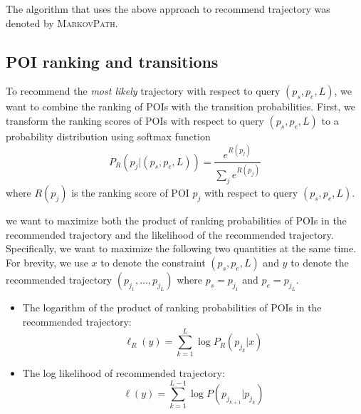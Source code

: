 The algorithm that uses the above approach to recommend trajectory was denoted by \textsc{MarkovPath}.


\subsection{POI ranking and transitions}
To recommend the \textit{most likely} trajectory with respect to query $(p_s, p_e, L)$,
we want to combine the ranking of POIs with the transition probabilities.
First, we transform the ranking scores of POIs with respect to query $(p_s, p_e, L)$
to a probability distribution using softmax function
\begin{displaymath}
    P_R(p_j |(p_s, p_e, L)) = \frac{e^{R(p_j)}}{\sum_j e^{R(p_j)}}
\end{displaymath}
where $R(p_j)$ is the ranking score of POI $p_j$ with respect to query $(p_s, p_e, L)$.

we want to maximize both the product of ranking probabilities of POIs in the recommended trajectory and
the likelihood of the recommended trajectory.
Specifically, we want to maximize the following two quantities at the same time.
For brevity, we use $x$ to denote the constraint $(p_s, p_e, L)$ and $y$ to denote the
recommended trajectory $(p_{j_1}, \dots, p_{j_L})$ where $p_s = p_{j_1}$ and $p_e = p_{j_L}$.
\begin{itemize}
\item The logarithm of the product of ranking probabilities of POIs in the recommended trajectory:
      \begin{displaymath}
          \ell_R(y) = \sum_{k=1}^L \log P_R(p_{j_k} | x)
      \end{displaymath}
\item The log likelihood of recommended trajectory:
      \begin{displaymath}
          \ell(y) = \sum_{k=1}^{L-1} \log P(p_{j_{k+1}} | p_{j_k})
      \end{displaymath}
\end{itemize}

